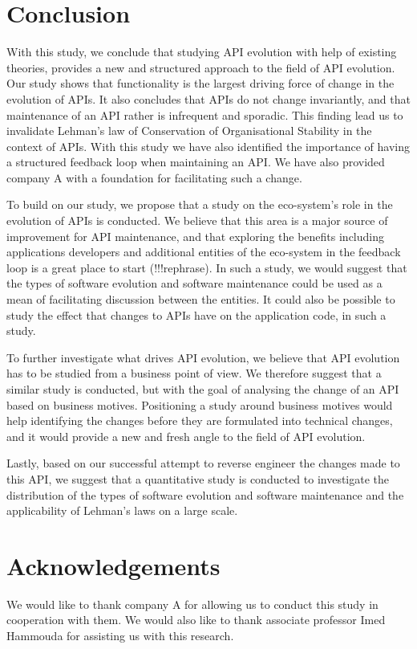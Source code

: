 \documentclass{sig-alternate}
\begin{document}
\section{Conclusion} \label{conclusion}
With this study, we conclude that studying API evolution with help of existing theories, provides a new and structured approach to the field of API evolution. Our study shows that functionality is the largest driving force of change in the evolution of APIs. It also concludes that APIs do not change invariantly, and that maintenance of an API rather is infrequent and sporadic. This finding lead us to invalidate Lehman's law of Conservation of Organisational Stability in the context of APIs. With this study we have also identified the importance of having a structured feedback loop when maintaining an API. We have also provided company A with a foundation for facilitating such a change. 

To build on our study, we propose that a study on the eco-system's role in the evolution of APIs is conducted. We believe that this area is a major source of improvement for API maintenance, and that exploring the benefits including applications developers and additional entities of the eco-system in the feedback loop is a great place to start (!!!rephrase). In such a study, we would suggest that the types of software evolution and software maintenance \cite{chapin2001types} could be used as a mean of facilitating discussion between the entities. It could also be possible to study the effect that changes to APIs have on the application code, in such a study. 

To further investigate what drives API evolution, we believe that API evolution has to be studied from a business point of view. We therefore suggest that a similar study is conducted, but with the goal of analysing the change of an API based on business motives. Positioning a study around business motives would help identifying the changes before they are formulated into technical changes, and it would provide a new and fresh angle to the field of API evolution. 

Lastly, based on our successful attempt to reverse engineer the changes made to this API, we suggest that a quantitative study is conducted to investigate the distribution of the types of software evolution and software maintenance and the applicability of Lehman's laws on a large scale. 










\section{Acknowledgements}
We would like to thank company A for allowing us to conduct this study in cooperation with them. We would also like to thank associate professor Imed Hammouda for assisting us with this research. 



 
\end{document}
